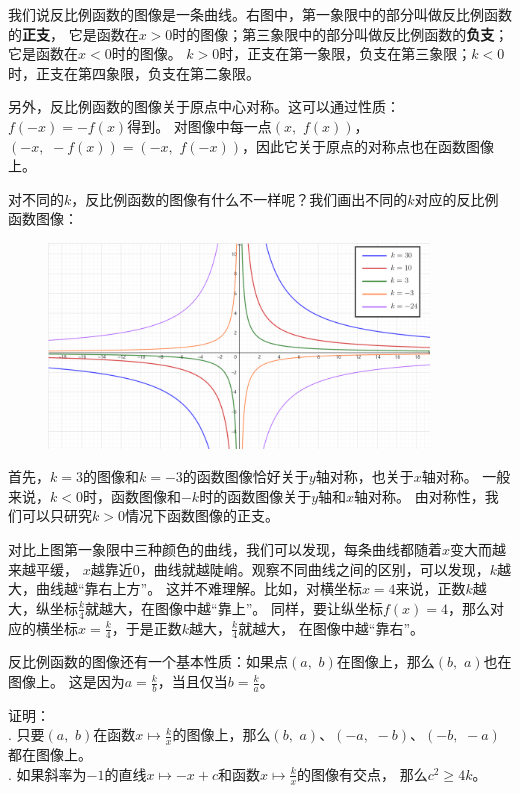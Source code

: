 \documentclass[12pt,UTF8]{ctexbook}
\begin{document}
我们说反比例函数的图像是一条曲线。右图中，第一象限中的部分叫做反比例函数的\textbf{正支}，
它是函数在$x>0$时的图像；第三象限中的部分叫做反比例函数的\textbf{负支}；它是函数在$x<0$时的图像。
$k>0$时，正支在第一象限，负支在第三象限；$k<0$时，正支在第四象限，负支在第二象限。

另外，反比例函数的图像关于原点中心对称。这可以通过性质：$f(-x) = -f(x)$得到。
对图像中每一点$(x, \,\,f(x))$，$(-x, \,\,-f(x)) = (-x, \,\,f(-x))$，因此它关于原点的对称点也在函数图像上。

对不同的$k$，反比例函数的图像有什么不一样呢？我们画出不同的$k$对应的反比例函数图像：

\begin{figure}[h] %
    \centering
    \includegraphics[width=0.9\textwidth]{tu/反比例函数2.png}
\end{figure}

首先，$k=3$的图像和$k=-3$的函数图像恰好关于$y$轴对称，也关于$x$轴对称。
一般来说，$k<0$时，函数图像和$-k$时的函数图像关于$y$轴和$x$轴对称。
由对称性，我们可以只研究$k>0$情况下函数图像的正支。

对比上图第一象限中三种颜色的曲线，我们可以发现，每条曲线都随着$x$变大而越来越平缓，
$x$越靠近$0$，曲线就越陡峭。观察不同曲线之间的区别，可以发现，$k$越大，曲线越“靠右上方”。
这并不难理解。比如，对横坐标$x = 4$来说，正数$k$越大，纵坐标$\frac{k}{4}$就越大，在图像中越“靠上”。
同样，要让纵坐标$f(x) = 4$，那么对应的横坐标$x = \frac{k}{4}$，于是正数$k$越大，$\frac{k}{4}$就越大，
在图像中越“靠右”。

反比例函数的图像还有一个基本性质：如果点$(a, \,\,b)$在图像上，那么$(b, \,\,a)$也在图像上。
这是因为$a = \frac{k}{b}$，当且仅当$b = \frac{k}{a}$。
\begin{xt}\label{xt:5-0-0}
    证明：\\
    . 只要$(a, \,\,b)$在函数$x \mapsto \frac{k}{x}$的图像上，那么$(b, \,\,a)$、$(-a, \,\,-b)$、$(-b, \,\,-a)$
    都在图像上。\\
    . 如果斜率为$-1$的直线$x\mapsto -x + c$和函数$ x \mapsto \frac{k}{x}$的图像有交点，
    那么$c^2 \geqslant 4k$。
\end{xt}
\end{document}
